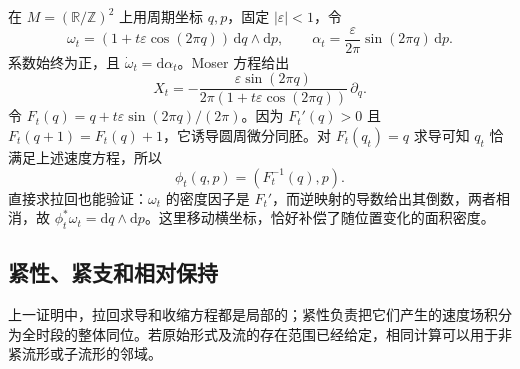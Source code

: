 \begin{example}\label{g4:exm:0801:torus-density}
	在 \(M=(\mathbb R/\mathbb Z)^2\) 上用周期坐标 \(q,p\)，固定 \(|\varepsilon|<1\)，令
	\[
		\omega_t=(1+t\varepsilon\cos(2\pi q))\,\mathrm{d}q\wedge\mathrm{d}p,
		\qquad
		\alpha_t=\frac{\varepsilon}{2\pi}\sin(2\pi q)\,\mathrm{d}p.
	\]
	系数始终为正，且 \(\dot\omega_t=\mathrm{d}\alpha_t\)。Moser 方程给出
	\[
		X_t=-\frac{\varepsilon\sin(2\pi q)}{2\pi(1+t\varepsilon\cos(2\pi q))}\,\partial_q.
	\]
	令 \(F_t(q)=q+t\varepsilon\sin(2\pi q)/(2\pi)\)。因为 \(F_t'(q)>0\) 且 \(F_t(q+1)=F_t(q)+1\)，它诱导圆周微分同胚。对 \(F_t(q_t)=q\) 求导可知 \(q_t\) 恰满足上述速度方程，所以
	\[
		\phi_t(q,p)=(F_t^{-1}(q),p).
	\]
	直接求拉回也能验证：\(\omega_t\) 的密度因子是 \(F_t'\)，而逆映射的导数给出其倒数，两者相消，故 \(\phi_t^*\omega_t=\mathrm{d}q\wedge\mathrm{d}p\)。这里移动横坐标，恰好补偿了随位置变化的面积密度。
\end{example}

\subsection{紧性、紧支和相对保持}
\label{g4:subsec:0801:04}

上一证明中，拉回求导和收缩方程都是局部的；紧性负责把它们产生的速度场积分为全时段的整体同位。若原始形式及流的存在范围已经给定，相同计算可以用于非紧流形或子流形的邻域。

